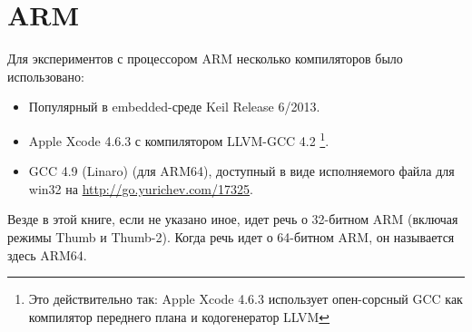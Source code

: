 \section{ARM}
\label{sec:hw_ARM}

\myindex{\idevices}
Для экспериментов с процессором ARM несколько компиляторов было использовано:

\begin{itemize}
\item Популярный в embedded-среде Keil Release 6/2013.

\item Apple Xcode 4.6.3 с компилятором LLVM-GCC 4.2
\footnote{Это действительно так: Apple Xcode 4.6.3 использует опен-сорсный GCC как компилятор переднего плана и кодогенератор LLVM}.

\item GCC 4.9 (Linaro) (для ARM64), 
доступный в виде исполняемого файла для win32 на \url{http://go.yurichev.com/17325}.

\end{itemize}

Везде в этой книге, если не указано иное, идет речь о 32-битном ARM (включая режимы Thumb и Thumb-2).
Когда речь идет о 64-битном ARM, он называется здесь ARM64.







